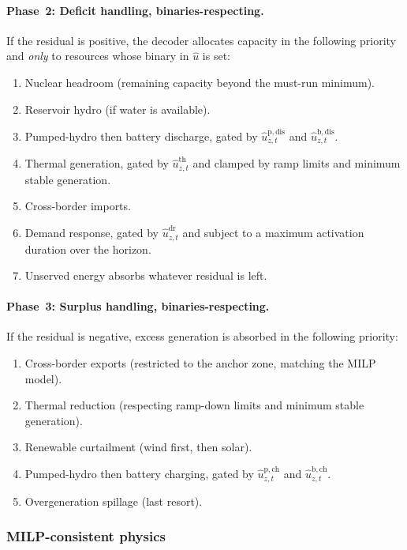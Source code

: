 \documentclass{article}
\begin{document}
\paragraph{Phase~2: Deficit handling, binaries-respecting.}
If the residual is positive, the decoder allocates capacity in the following priority and \emph{only} to resources whose binary in $\hat{u}$ is set:
\begin{enumerate}[noitemsep]
  \item Nuclear headroom (remaining capacity beyond the must-run minimum).
  \item Reservoir hydro (if water is available).
  \item Pumped-hydro then battery discharge, gated by $\hat{u}^{\mathrm{p,dis}}_{z,t}$ and $\hat{u}^{\mathrm{b,dis}}_{z,t}$.
  \item Thermal generation, gated by $\hat{u}^{\mathrm{th}}_{z,t}$ and clamped by ramp limits and minimum stable generation.
  \item Cross-border imports.
  \item Demand response, gated by $\hat{u}^{\mathrm{dr}}_{z,t}$ and subject to a maximum activation duration over the horizon.
  \item Unserved energy absorbs whatever residual is left.
\end{enumerate}

\paragraph{Phase~3: Surplus handling, binaries-respecting.}
If the residual is negative, excess generation is absorbed in the following priority:
\begin{enumerate}[noitemsep]
  \item Cross-border exports (restricted to the anchor zone, matching the MILP model).
  \item Thermal reduction (respecting ramp-down limits and minimum stable generation).
  \item Renewable curtailment (wind first, then solar).
  \item Pumped-hydro then battery charging, gated by $\hat{u}^{\mathrm{p,ch}}_{z,t}$ and $\hat{u}^{\mathrm{b,ch}}_{z,t}$.
  \item Overgeneration spillage (last resort).
\end{enumerate}

\subsubsection{MILP-consistent physics}
\end{document}
